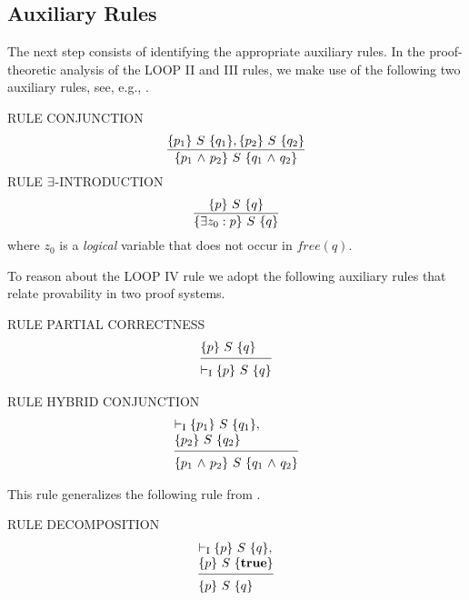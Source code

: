 \documentclass[runningheads]{llncs}       %
\begin{document}
\subsection{Auxiliary Rules}
\label{subsec:aux}

The next step consists of identifying the appropriate auxiliary rules. 
In the proof-theoretic analysis of the LOOP II and III rules, we make
use of the following two auxiliary rules, see, e.g., \cite{ABO09}.
\III

\NI
RULE \label{rul:conj} CONJUNCTION
\[ 
 \frac{ \mbox{$\{{p_1}\}\ {S}\ \{{q_1}\}$}, \mbox{$\{{p_2}\}\ {S}\ \{{q_2}\}$}     }
      { \mbox{$\{{p_1 \mbox{$\ \wedge\ $} p_2}\}\ {S}\ \{{q_1 \mbox{$\ \wedge\ $} q_2}\}$}         } 
\]
\NI
RULE \label{rul:intro} $\mbox{$\exists$}$-INTRODUCTION 
\[ 
 \frac{ \mbox{$\{{p}\}\ {S}\ \{{q}\}$}          }
      { \mbox{$\{{\mbox{$\exists$} z_0:p}\}\ {S}\ \{{q}\}$}    }
\]
\NI
where $z_0$ is a \emph{logical} variable that does not occur  in $\mathit{free}(q)$.
\III

To reason about the LOOP IV rule we adopt the following auxiliary
rules that relate provability in two proof systems.
\III

\NI
RULE PARTIAL CORRECTNESS
\[
 \begin{array}{l}
   \HT{p}{S}{q}\\
  [-\medskipamount]
  \hrulefill                         \\
  \vdash_{\rm{I}} \HT{p}{S}{q}
  \end{array}
\]

\III

\noindent
RULE HYBRID CONJUNCTION
\[
 \begin{array}{l}
  \vdash_{\rm{I}} \HT{p_1}{S}{q_1},   \\
  \HT{p_2}{S}{q_2}                    \\
  [-\medskipamount]
  \hrulefill                          \\
  \HT{p_1 \A p_2}{S}{q_1 \A q_2}
 \end{array}
\]

This rule generalizes the following rule from \cite{ABO09}.
\III

\noindent
RULE DECOMPOSITION
\[
 \begin{array}{l}
  \vdash_{\rm{I}} \HT{p}{S}{q},      \\
  \HT{p}{S}{\T}                      \\
  [-\medskipamount]
  \hrulefill                         \\
  \HT{p}{S}{q}
  \end{array}
\]

\III

\end{document}

